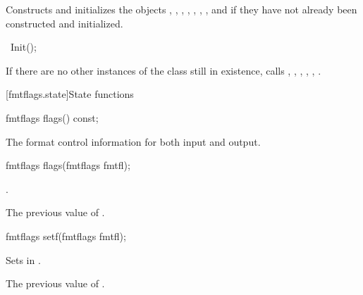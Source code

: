 \begin{itemdescr}
\pnum
\effects
Constructs and initializes the objects , , ,
, , , , and  if
they have not already been constructed and initialized.
\end{itemdescr}

\begin{indexed}{}
\begin{itemdecl}
~Init();
\end{itemdecl}
\end{indexed}

\begin{itemdescr}
\pnum
\effects
If there are no other instances of the class still in existence,
calls
%
,
,
,
,
,
.
\end{itemdescr}

[fmtflags.state]{State functions}

%
\begin{itemdecl}
fmtflags flags() const;
\end{itemdecl}

\begin{itemdescr}
\pnum
\returns
The format control information for both input and output.
\end{itemdescr}

%
\begin{itemdecl}
fmtflags flags(fmtflags fmtfl);
\end{itemdecl}

\begin{itemdescr}
\pnum
\ensures
{}.

\pnum
\returns
The previous value of
.
\end{itemdescr}

%
\begin{itemdecl}
fmtflags setf(fmtflags fmtfl);
\end{itemdecl}

\begin{itemdescr}
\pnum
\effects
Sets  in
.

\pnum
\returns
The previous value of
.
\end{itemdescr}

